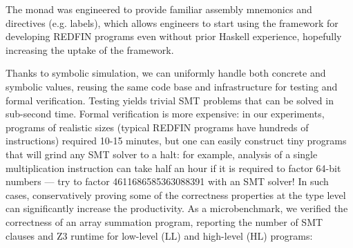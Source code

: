 
The  monad was engineered to provide familiar assembly mnemonics and
directives (e.g. labels), which allows engineers to start
using the framework for developing REDFIN programs even without prior Haskell
experience, hopefully increasing the uptake of the framework.

Thanks to symbolic simulation, we can uniformly handle both concrete and
symbolic values, reusing the same code base and infrastructure for testing and
formal verification.
Testing yields trivial SMT problems that can be solved in sub-second time.
Formal verification is more expensive: in our experiments,
programs of realistic sizes (typical REDFIN programs have hundreds of
instructions) required 10-15 minutes, but one can
easily construct tiny programs that will grind any SMT solver to a halt:
for example, analysis of a single multiplication instruction can take half an
hour if it is required to factor 64-bit numbers --- try to factor
4611686585363088391 with an SMT solver! In such cases, conservatively proving
some of the correctness properties at the type level can significantly increase
the productivity. As a microbenchmark, we verified the correctness of an array
summation program, reporting the number of SMT clauses and Z3 runtime for
low-level (LL) and high-level (HL) programs:


